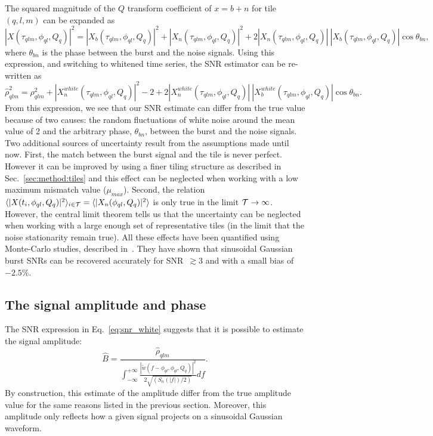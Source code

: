 The squared magnitude of the $Q$ transform coefficient of $x=b+n$ for tile $(q,l,m)$ can be expanded as
\begin{equation}
  |X(\tau_{qlm}, \phi_{ql}, Q_q)|^2 = |X_b(\tau_{qlm}, \phi_{ql}, Q_q)|^2 + |X_n(\tau_{qlm}, \phi_{ql}, Q_q)|^2 + 2|X_n(\tau_{qlm}, \phi_{ql}, Q_q)|\ |X_b(\tau_{qlm}, \phi_{ql}, Q_q)|\cos{\theta_{bn}},
\end{equation}
where $\theta_{bn}$ is the phase between the burst and the noise signals. Using this expression, and switching to whitened time series, the SNR estimator can be re-written as
\begin{equation}
  \hat{\rho}_{qlm}^2  =
  \rho_{qlm}^2
  + |X^{white}_n(\tau_{qlm}, \phi_{ql}, Q_q)|^2 -2
  + 2|X^{white}_n(\tau_{qlm}, \phi_{ql}, Q_q)|\ |X^{white}_b(\tau_{qlm}, \phi_{ql}, Q_q)| \cos{\theta_{bn}}.
\end{equation}
From this expression, we see that our SNR estimate can differ from the true value because of two causes: the random fluctuations of white noise around the mean value of 2 and the arbitrary phase, $\theta_{bn}$, between the burst and the noise signals. Two additional sources of uncertainty result from the assumptions made until now. First, the match between the burst signal and the tile is never perfect. However it can be improved by using a finer tiling structure as described in Sec.~\ref{sec:method:tiles} and this effect can be neglected when working with a low maximum mismatch value ($\mu_{max}$). Second, the relation $\langle |X(t_i, \phi_{ql}, Q_q)|^2 \rangle_{i\in \cal{T}}=\langle |X_n(\phi_{ql}, Q_q)|^2 \rangle$ is only true in the limit $\cal{T}\rightarrow \infty$. However, the central limit theorem tells us that the uncertainty can be neglected when working with a large enough set of representative tiles (in the limit that the noise stationarity remain true). All these effects have been quantified using Monte-Carlo studies, described in~\cite{Chatterji:2004}. They have shown that sinusoidal Gaussian burst SNRs can be recovered accurately for SNR~$\gtrsim 3$ and with a small bias of $-2.5\%$. 


\subsection{The signal amplitude and phase} \label{sec:method:ampphase}

The SNR expression in Eq.~\ref{eq:snr_white} suggests that it is possible to estimate the signal amplitude:
\begin{equation}
  \hat{B} = \frac{\hat{\rho}_{qlm}}{\int_{-\infty}^{+\infty}{\frac{|\tilde{w}(f-\phi_{ql},\phi_{ql},Q_q)|^2}{2\sqrt{(S_n(|f|)/2)}}df}}.
  \label{eq:amplitude}
\end{equation}
By construction, this estimate of the amplitude differ from the true amplitude value for the same reasons listed in the previous section. Moreover, this amplitude only reflects how a given signal projects on a sinusoidal Gaussian waveform.

